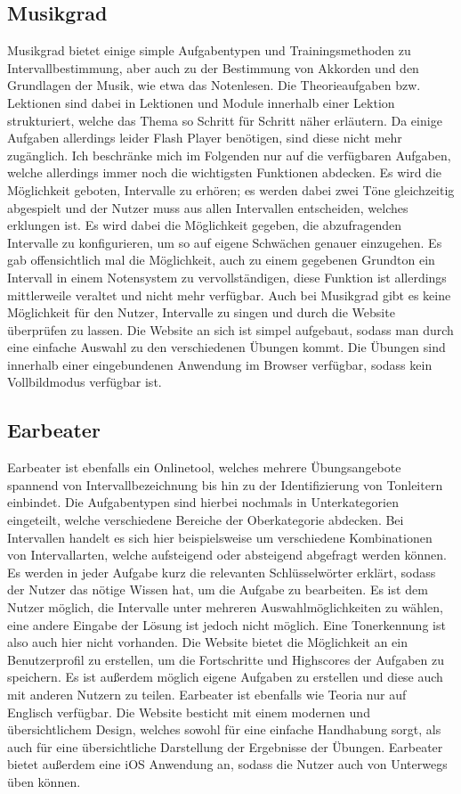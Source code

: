 \subsection*{Musikgrad}
\label{sec:Musikgrad}
Musikgrad bietet einige simple Aufgabentypen und Trainingsmethoden zu Intervallbestimmung, aber auch zu der Bestimmung von Akkorden und den Grundlagen der Musik, wie etwa das Notenlesen. Die Theorieaufgaben bzw. Lektionen sind dabei in Lektionen und Module innerhalb einer Lektion strukturiert, welche das Thema so Schritt für Schritt näher erläutern. Da einige Aufgaben allerdings leider Flash Player benötigen, sind diese nicht mehr zugänglich. Ich beschränke mich im Folgenden nur auf die verfügbaren Aufgaben, welche allerdings immer noch die wichtigsten Funktionen abdecken. Es wird die Möglichkeit geboten, Intervalle zu erhören; es werden dabei zwei Töne gleichzeitig abgespielt und der Nutzer muss aus allen Intervallen entscheiden, welches erklungen ist. Es wird dabei die Möglichkeit gegeben, die abzufragenden Intervalle zu konfigurieren, um so auf eigene Schwächen genauer einzugehen. Es gab offensichtlich mal die Möglichkeit, auch zu einem gegebenen Grundton ein Intervall in einem Notensystem zu vervollständigen, diese Funktion
ist allerdings mittlerweile veraltet und nicht mehr verfügbar. Auch bei Musikgrad gibt es keine Möglichkeit für den Nutzer, Intervalle zu singen und durch die Website überprüfen zu lassen. Die Website an sich ist simpel aufgebaut, sodass man durch eine einfache Auswahl zu den verschiedenen Übungen kommt. Die Übungen sind innerhalb einer eingebundenen Anwendung im Browser verfügbar, sodass kein Vollbildmodus verfügbar ist. \cite{musikgrad}


\subsection*{Earbeater}
\label{sec:Earbeater}
Earbeater ist ebenfalls ein Onlinetool, welches mehrere Übungsangebote spannend von Intervallbezeichnung bis hin zu der Identifizierung von Tonleitern einbindet. Die Aufgabentypen sind hierbei nochmals in Unterkategorien eingeteilt, welche verschiedene Bereiche der 
Oberkategorie abdecken. Bei Intervallen handelt es sich hier beispielsweise um verschiedene Kombinationen von Intervallarten, welche aufsteigend oder absteigend abgefragt werden können. Es werden in jeder Aufgabe kurz die relevanten Schlüsselwörter erklärt, sodass der Nutzer das nötige Wissen hat, um die Aufgabe zu bearbeiten. Es ist dem Nutzer möglich, die Intervalle unter mehreren Auswahlmöglichkeiten zu wählen, eine andere Eingabe der Lösung ist jedoch nicht möglich. Eine Tonerkennung ist also auch hier nicht vorhanden. Die Website bietet die Möglichkeit an ein Benutzerprofil zu erstellen, um die Fortschritte und Highscores der Aufgaben zu speichern. Es ist außerdem möglich eigene Aufgaben zu erstellen und diese 
auch mit anderen Nutzern zu teilen. Earbeater ist ebenfalls wie Teoria nur auf Englisch verfügbar. Die Website besticht mit einem modernen und übersichtlichem Design, welches sowohl für eine einfache Handhabung sorgt, als auch für eine übersichtliche Darstellung der Ergebnisse der Übungen. Earbeater bietet außerdem 
eine iOS Anwendung an, sodass die Nutzer auch von Unterwegs üben können. \cite{earbeater}

